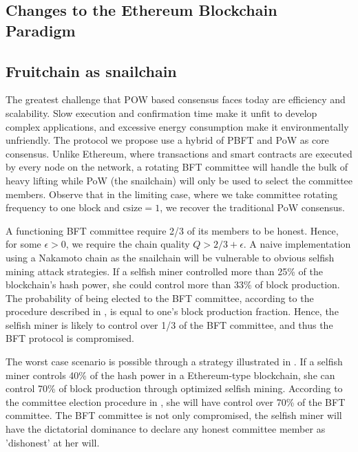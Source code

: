 \documentclass[9pt,oneside]{amsart}
\begin{document}
\begin{multicols}{2}
\section{Changes to the Ethereum Blockchain Paradigm}

\subsection{Fruitchain as snailchain}

The greatest challenge that POW based consensus faces today are efficiency and scalability. Slow execution and confirmation time make it unfit to develop complex applications, and excessive energy consumption make it environmentally unfriendly. The protocol we propose use a hybrid of PBFT and PoW as core consensus. Unlike Ethereum, where transactions and smart contracts are executed by every node on the network, a rotating BFT committee will handle the bulk of heavy lifting while PoW (the snailchain) will only be used to select the committee members. Observe that in the limiting case, where we take committee rotating frequency to one block and $\mathrm{csize} = 1$, we recover the traditional PoW consensus. 

A functioning BFT committee require 2/3 of its members to be honest\cite{castro1999practical}. Hence, for some $\epsilon > 0$, we require the chain quality $Q > 2/3 + \epsilon$. A naive implementation using a Nakamoto chain as the snailchain will be vulnerable to obvious selfish mining attack strategies. If a selfish miner controlled more than 25\% of the blockchain's hash power, she could control more than 33\% of block production\cite{naya2015stub}\cite{eyal2013self}. The probability of being elected to the BFT committee, according to the procedure described in \cite{pass2017hybrid}, is equal to one's block production fraction. Hence, the selfish miner is likely to control over 1/3 of the BFT committee, and thus the BFT protocol is compromised. 

The worst case scenario is possible through a strategy illustrated in \cite{ritz2018uncle}. If a selfish miner controls 40\% of the hash power in a Ethereum-type blockchain, she can control 70\% of block production through optimized selfish mining. According to the committee election procedure in \cite{pass2017hybrid}, she will have control over 70\% of the BFT committee. The BFT committee is not only compromised, the selfish miner will have the dictatorial dominance to declare any honest committee member as 'dishonest' at her will. 


\end{multicols}
\end{document}

